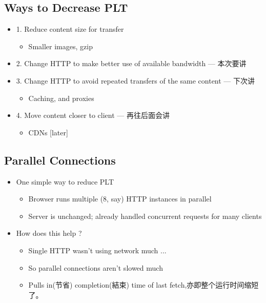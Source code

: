\documentclass[12pt]{ctexart}   %
\begin{document}
	\subsection{Ways to Decrease PLT}
	\begin{itemize}
		\item {\color{blue} 1.} Reduce content size for transfer
		\begin{itemize}
			\item Smaller images, gzip
		\end{itemize}
		
		\item {\color{blue} 2.} Change HTTP to make better use of available bandwidth ---  {\color{pink} 本次要讲}
		
		\item  {\color{blue} 3.} Change HTTP to avoid repeated transfers of the same content  --- {\color{pink} 下次讲}
		\begin{itemize}
			\item Caching, and proxies
		\end{itemize}
		
		\item  {\color{blue} 4.} Move content closer to client --- {\color{pink} 再往后面会讲}
		\begin{itemize}
			\item CDNs [later]
		\end{itemize}
	\end{itemize}
	
	\subsection{Parallel Connections}
	\begin{itemize}
		\item One simple way to reduce PLT
		\begin{itemize}
			\item Browser runs multiple (8, say) HTTP instances in parallel
			\item Server is unchanged; already handled concurrent requests for many clients
		\end{itemize}
		
		\item How does this help ?
		\begin{itemize}
			\item Single HTTP wasn't using network much ...
			\item So parallel connections aren't slowed much
			\item Pulls in(节省) completion(結束) time of last fetch,亦即整个运行时间缩短了。
		\end{itemize}
	\end{itemize}
	
\end{document}
